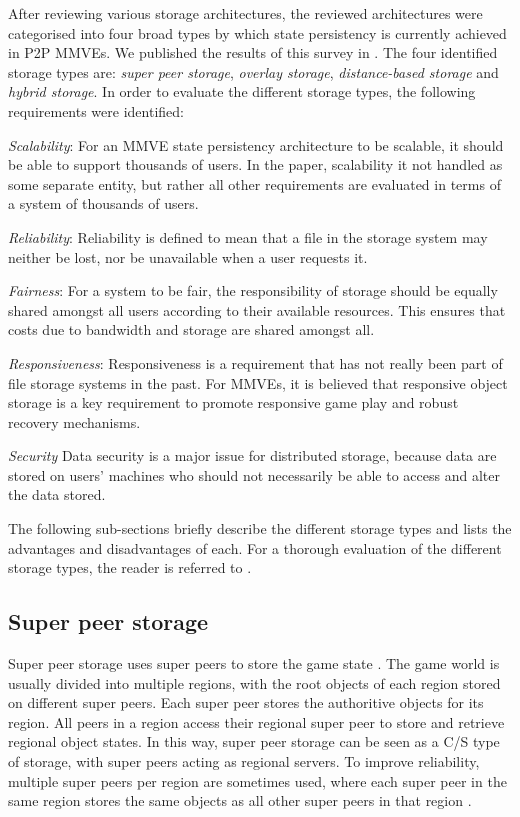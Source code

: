 \documentclass[10pt,a4paper,conference]{IEEEtran}
\begin{document}
After reviewing various storage architectures, the reviewed architectures were categorised into four broad types by which state persistency is
currently achieved in P2P MMVEs. We published the results of this survey in \cite{gilmore_p2p_mmog_state_persistency}. The four identified storage
types are: \emph{super peer storage}, \emph{overlay storage}, \emph{distance-based storage} and \emph{hybrid storage}. In order to evaluate the
different storage types, the following requirements were identified:

\emph{Scalability}: For an MMVE state persistency architecture to be scalable, it should be able to support thousands of users. In the paper,
scalability it not handled as some separate entity, but rather all other requirements are evaluated in terms of a system of thousands of users.

\emph{Reliability}: Reliability is defined to mean that a file in the storage system may neither be lost, nor be unavailable when a user requests it.

\emph{Fairness}: For a system to be fair, the responsibility of storage should be equally shared amongst all users according to their available
resources. This ensures that costs due to bandwidth and storage are shared amongst all.

\emph{Responsiveness}: Responsiveness is a requirement that has not really been part of file storage systems in the past. For MMVEs, it is believed
that responsive object storage is a key requirement to promote responsive game play and robust recovery mechanisms.

\emph{Security} Data security is a major issue for distributed storage, because data are stored on users' machines who should not necessarily be able
to access and alter the data stored.

The following sub-sections briefly describe the different storage types and lists the advantages and disadvantages of each. For a thorough evaluation
of the different storage types, the reader is referred to \cite{gilmore_p2p_mmog_state_persistency}.

\subsection{Super peer storage}

Super peer storage uses super peers to store the game state \cite{knutsson_p2p_first}. The game world is usually divided into multiple regions, with
the root objects of each region stored on different super peers. Each super peer stores the authoritive objects for its region. All peers in a region
access their regional super peer to store and retrieve regional object states. In this way, super peer storage can be seen as a C/S type of storage,
with super peers acting as regional servers. To improve reliability, multiple super peers per region are sometimes used, where each super peer in the
same region stores the same objects as all other super peers in that region \cite{varvello_p2p_second_life}.
\end{document}
